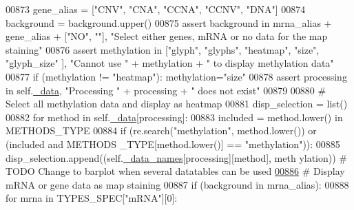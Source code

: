 \begin{DoxyCode}
00873         gene\_alias = [\textcolor{stringliteral}{"CNV"}, \textcolor{stringliteral}{"CNA"}, \textcolor{stringliteral}{"CCNA"}, \textcolor{stringliteral}{"CCNV"}, \textcolor{stringliteral}{"DNA"}]
00874         background = background.upper()
00875         \textcolor{keyword}{assert} background \textcolor{keywordflow}{in} mrna\_alias + gene\_alias + [\textcolor{stringliteral}{"NO"}, \textcolor{stringliteral}{""}], \textcolor{stringliteral}{"Select either
       genes, mRNA or no data for the map staining"}
00876         \textcolor{keyword}{assert} methylation \textcolor{keywordflow}{in} [\textcolor{stringliteral}{"glyph"}, \textcolor{stringliteral}{"glyphs"}, \textcolor{stringliteral}{"heatmap"}, \textcolor{stringliteral}{"size"}, \textcolor{stringliteral}{"glyph\_size"
      }], \textcolor{stringliteral}{"Cannot use "} + methylation + \textcolor{stringliteral}{" to display methylation data"}
00877         \textcolor{keywordflow}{if} (methylation != \textcolor{stringliteral}{"heatmap"}): methylation=\textcolor{stringliteral}{"size"}
00878         \textcolor{keyword}{assert} processing \textcolor{keywordflow}{in} self.\hyperlink{classnavicom_1_1navicom_1_1NaviCom_a407b2b5c30a5652ee85c4be54b3e6679}{_data}, \textcolor{stringliteral}{"Processing "} + processing + \textcolor{stringliteral}{" does not 
      exist"}
00879 
00880         \textcolor{comment}{# Select all methylation data and display as heatmap}
00881         disp\_selection = list()
00882         \textcolor{keywordflow}{for} method \textcolor{keywordflow}{in} self.\hyperlink{classnavicom_1_1navicom_1_1NaviCom_a407b2b5c30a5652ee85c4be54b3e6679}{_data}[processing]:
00883             included = method.lower() \textcolor{keywordflow}{in} METHODS\_TYPE
00884             \textcolor{keywordflow}{if} (re.search(\textcolor{stringliteral}{"methylation"}, method.lower()) \textcolor{keywordflow}{or} (included \textcolor{keywordflow}{and} METHODS
      \_TYPE[method.lower()] == \textcolor{stringliteral}{"methylation"})):
00885                 disp\_selection.append((self.\hyperlink{classnavicom_1_1navicom_1_1NaviCom_ab8c34ab1a6d2a23f9b9ecee65375317a}{_data_names}[processing][method], meth
      ylation)) \textcolor{comment}{# TODO Change to barplot when several datatables can be used}
\hypertarget{navicom_8py_source_l00886}{}\hyperlink{classnavicom_1_1navicom_1_1NaviCom_a018f936de625af8a5dd7e8250ede6483}{00886}         \textcolor{comment}{# Display mRNA or gene data as map staining}
00887         \textcolor{keywordflow}{if} (background \textcolor{keywordflow}{in} mrna\_alias):
00888             \textcolor{keywordflow}{for} mrna \textcolor{keywordflow}{in} TYPES\_SPEC[\textcolor{stringliteral}{"mRNA"}][0]:

\end{DoxyCode}
